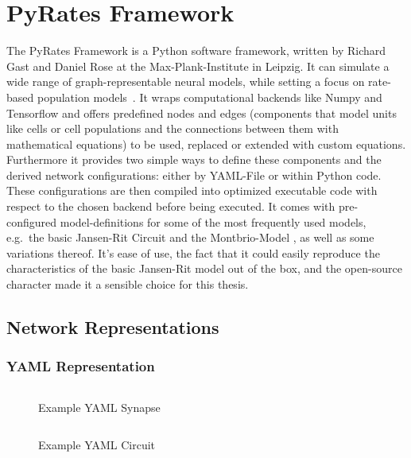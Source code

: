 
\section{PyRates Framework}\label{sec:pyrates-framework}
The PyRates Framework is a Python software framework, written by Richard Gast and Daniel Rose at
the Max-Plank-Institute in Leipzig.
It can simulate a wide range of graph-representable neural models,
while setting a focus on rate-based population models~\parencite{gast_pyratespython_2019}.
It wraps computational backends like Numpy and Tensorflow and offers predefined nodes and
edges (components that model units like cells or cell populations and the
connections between them with mathematical equations) to be used,
replaced or extended with custom equations.
Furthermore it provides two simple ways to define these components and the derived network configurations:
either by YAML-File or within Python code.
These configurations are then compiled into optimized executable code with respect to
the chosen backend before being executed.
It comes with pre-configured model-definitions for some of the most frequently used models, e.g.\ the basic
Jansen-Rit Circuit \parencite{jansen_electroencephalogram_1995} and the
Montbrio-Model \parencite{montbrio_macroscopic_2015}, as well as some variations thereof.
It's ease of use, the fact that it could easily reproduce the characteristics of
the basic Jansen-Rit model out of the box, and the open-source character made it a sensible choice for this thesis.
\subsection{Network Representations}\label{subsec:network-representations}

\subsubsection{YAML Representation}


\begin{figure}[H]
	\inputminted[frame=lines, linenos, fontsize=\footnotesize, baselinestretch=1.2, bgcolor=LightGray, tabsize=4]
	{yaml}{Chapters/Chapter_02_Technical_Concepts/code/yaml_synapse.yaml}
	
	\caption{Example YAML Synapse}\label{fig:yaml_synapse}
\end{figure}

\begin{figure}[H]
	\inputminted[frame=lines, linenos, fontsize=\footnotesize, baselinestretch=1.2, bgcolor=LightGray, tabsize=4]
	{yaml}{Chapters/Chapter_02_Technical_Concepts/code/yaml_circuit.yaml}

	\caption{Example YAML Circuit}\label{fig:yaml_circuit}
\end{figure}
